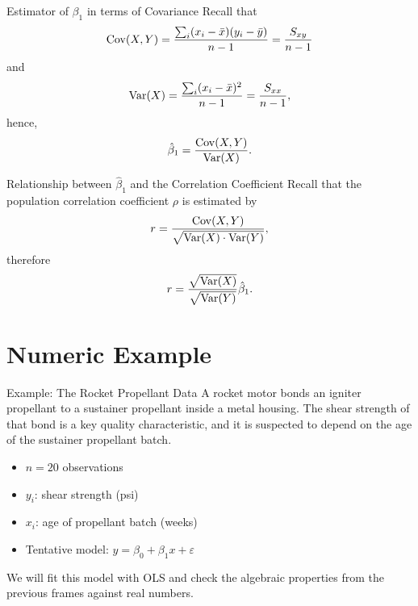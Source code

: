 \begin{frame}{Estimator of \texorpdfstring{\(\beta_1\)}{beta1} in terms of Covariance}
	Recall that
	\[
		\operatorname{Cov}(X, Y) = \frac{\sum_i (x_i - \bar x)(y_i - \bar y)}{n-1} = \frac{S_{xy}}{n-1} 
	\]
	and
	\[
		\operatorname{Var}(X) = \frac{\sum_i (x_i - \bar x)^2}{n-1} = \frac{S_{xx}}{n-1},
	\]
	hence,
	\[
		\hat{\beta}_1 = \frac{\operatorname{Cov}(X, Y)}{\operatorname{Var}(X)}.
	\]
\end{frame}


\begin{frame}{Relationship between \texorpdfstring{\(\hat{\beta}_1\)}{beta1hat} and the Correlation Coefficient}
	Recall that the population correlation coefficient \(\rho\) is estimated by
	\[
		r = \frac{\operatorname{Cov}(X, Y)}{\sqrt{\operatorname{Var}(X) \cdot \operatorname{Var}(Y)}},
	\]
	therefore
	\[
		r = \frac{\sqrt{\operatorname{Var}(X)}}{\sqrt{\operatorname{Var}(Y)}} \hat{\beta}_1.
	\]
\end{frame}


\section{Numeric Example}


\begin{frame}{Example: The Rocket Propellant Data}
	A rocket motor bonds an igniter propellant to a sustainer propellant inside a metal housing. The shear strength of that bond is a key quality characteristic, and it is suspected to depend on the age of the sustainer propellant batch.
	\svspace{0.5em}
	\begin{itemize}
		\item $n = 20$ observations
		\item $y_i$: shear strength (psi)
		\item $x_i$: age of propellant batch (weeks)
		\item Tentative model: $y = \beta_0 + \beta_1 x + \varepsilon$
	\end{itemize}
	\svspace{0.5em}
	We will fit this model with OLS and check the algebraic properties from the previous frames against real numbers.
\end{frame}


